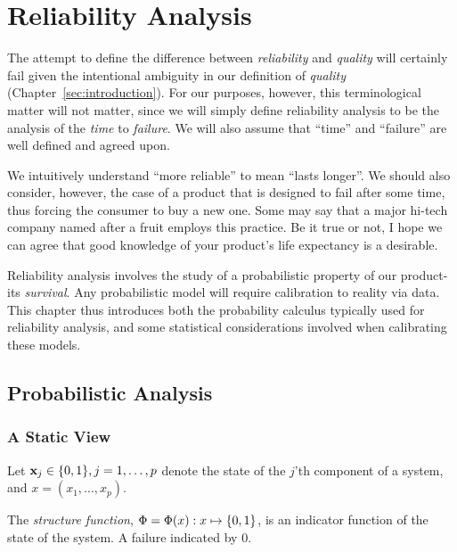 \chapter{Reliability Analysis}

The attempt to define the difference between \emph{reliability} and \emph{quality} will certainly fail given the intentional ambiguity in our definition of \emph{quality} (Chapter~\ref{sec:introduction}).
For our purposes, however, this terminological matter will not matter, since we will simply define reliability analysis to be the analysis of the \emph{time} to \emph{failure}.
We will also assume that ``time'' and ``failure'' are well defined and agreed upon.

We intuitively understand ``more reliable'' to mean ``lasts longer''. 
We should also consider, however, the case of a product that is designed to fail after some time, thus forcing the consumer to buy a new one. 
Some may say that a major hi-tech company named after a fruit employs this practice. 
Be it true or not, I hope we can agree that good knowledge of your product's life expectancy is a desirable. 

Reliability analysis involves the study of a probabilistic property of our product- its \emph{survival}.
Any probabilistic model will require calibration to reality via data. 
This chapter thus introduces both the probability calculus typically used for reliability analysis, and some statistical considerations involved when calibrating these models.



\section{Probabilistic Analysis}




\subsection{A Static View}

Let $\mathbf{x}_j \in \{ 0,1 \}, j=1,\dots,p$ denote the state of the $j$'th component of a system, and $x=(x_1,\dots,x_p)$.

\begin{definition}
The \emph{structure function}, $\Phi=\Phi(x):x \mapsto \{ 0,1 \}$, is an indicator function of the state of the system. A failure indicated by $0$. 
\end{definition}

